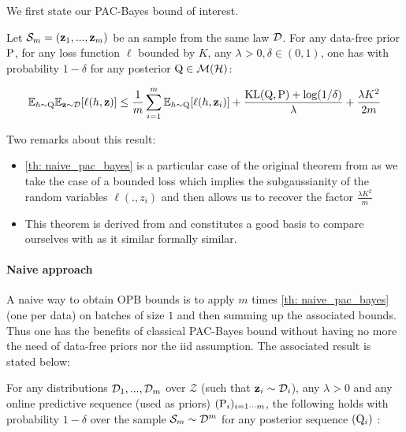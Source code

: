 \begin{noaddcontents}
We first state our PAC-Bayes bound of interest.

\begin{theorem}
  \label{th: naive_pac_bayes}
  Let $\Sm=(\z_1,...,\z_m)$ be an \iid sample from the same law $\D$.
  For any data-free prior $\P$, for any loss function $\ell$ bounded by $K$, any $\lambda>0,\delta\in (0,1)$, one has with probability $1-\delta$ for any posterior $\Q\in\mathcal{M}(\mathcal{H})$:

  \[ \mathbb{E}_{h\sim \Q}\mathbb{E}_{\z\sim \D}[\ell(h,\z)] \leq \frac{1}{m} \sum_{i=1}^m \mathbb{E}_{h\sim \Q}[\ell(h,\z_i)] + \frac{\operatorname{KL}(\Q,\P) + \log(1/\delta)}{\lambda} + \frac{\lambda K^2}{2m} \]
\end{theorem}

\begin{remark} Two remarks about this result:


  \begin{itemize}
    \item \cref{th: naive_pac_bayes} is a particular case of the original theorem from \cite{alquier2016properties} as we take the case of a bounded loss which implies the subgaussianity of the random variables $\ell(.,z_i)$ and then allows us to recover the factor $\frac{\lambda K^2}{m}$
    \item This theorem is derived from \cite{catoni2007pac} and constitutes a good basis to compare ourselves with as it similar formally similar.
  \end{itemize}
\end{remark}


\paragraph{Naive approach} A naive way to obtain OPB bounds is to apply $m$ times \cref{th: naive_pac_bayes} (one per data) on batches of size $1$ and then summing up the associated bounds. Thus one has the benefits of classical PAC-Bayes bound without having no more the need of data-free priors nor the iid assumption. The associated result is stated below:

\begin{theorem}
  \label{th: naive_approach}
  For any distributions $\D_1,...,\D_m$ over $\mathcal{Z}$ (such that $\z_i\sim \D_i$), any $\lambda>0$ and any online predictive sequence (used as priors) $(\P_{i})_{i=1\cdots m}$, the following holds with probability $1-\delta$ over the sample $\Sm\sim\D^m$ for any posterior sequence $(\Q_{i})$ :



\end{theorem}
\end{noaddcontents}
